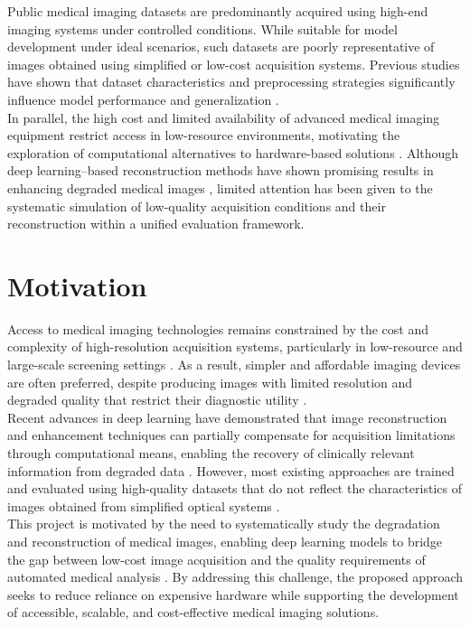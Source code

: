 \documentclass[12pt,letterpaper]{article}     %
\begin{document}
\noindent Public medical imaging datasets are predominantly acquired using high-end imaging systems under controlled conditions. While suitable for model development under ideal scenarios, such datasets are poorly representative of images obtained using simplified or low-cost acquisition systems. Previous studies have shown that dataset characteristics and preprocessing strategies significantly influence model performance and generalization \cite{QUINTA}.\\

\noindent In parallel, the high cost and limited availability of advanced medical imaging equipment restrict access in low-resource environments, motivating the exploration of computational alternatives to hardware-based solutions \cite{3}. Although deep learning–based reconstruction methods have shown promising results in enhancing degraded medical images \cite{zhang}, limited attention has been given to the systematic simulation of low-quality acquisition conditions and their reconstruction within a unified evaluation framework.






\section{Motivation}

\noindent Access to medical imaging technologies remains constrained by the cost and complexity of high-resolution acquisition systems, particularly in low-resource and large-scale screening settings \cite{3}. As a result, simpler and affordable imaging devices are often preferred, despite producing images with limited resolution and degraded quality that restrict their diagnostic utility \cite{QUINTA}.\\

\noindent Recent advances in deep learning have demonstrated that image reconstruction and enhancement techniques can partially compensate for acquisition limitations through computational means, enabling the recovery of clinically relevant information from degraded data \cite{zhang, ML}. However, most existing approaches are trained and evaluated using high-quality datasets that do not reflect the characteristics of images obtained from simplified optical systems \cite{QUINTA}.\\

\noindent This project is motivated by the need to systematically study the degradation and reconstruction of medical images, enabling deep learning models to bridge the gap between low-cost image acquisition and the quality requirements of automated medical analysis \cite{earlydetection}. By addressing this challenge, the proposed approach seeks to reduce reliance on expensive hardware while supporting the development of accessible, scalable, and cost-effective medical imaging solutions.
\end{document}
